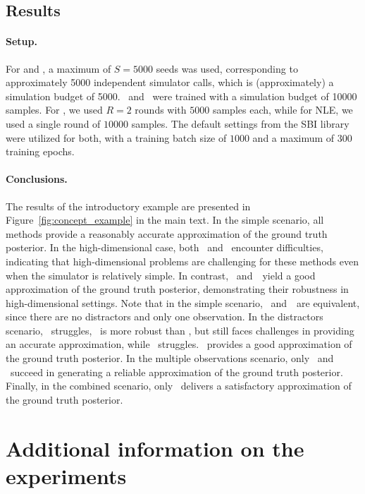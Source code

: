 \subsection{Results}

\paragraph{Setup.}
For \nromc and \rromc, a maximum of $S=5000$ seeds was used, corresponding to approximately 5000 independent simulator calls, which is (approximately) a simulation budget of 5000.
\NLE~and \NPE~were trained with a simulation budget of 10000 samples.
For \NPE, we used $R=2$ rounds with $5000$ samples each, while for NLE, we used a single round of $10000$ samples.
The default settings from the SBI library~\cite{lueckmann2021benchmarking} were utilized for both, with a training batch size of $1000$ and a maximum of $300$ training epochs.

\paragraph{Conclusions.}
The results of the introductory example are presented in Figure~\ref{fig:concept_example} in the main text.
In the simple scenario, all methods provide a reasonably accurate approximation of the ground truth posterior.
In the high-dimensional case, both \NPE~and \NLE~encounter difficulties, indicating that high-dimensional problems are challenging for these methods even when the simulator is relatively simple.
In contrast, \nromc~and~\rromc~yield a good approximation of the ground truth posterior, demonstrating their robustness in high-dimensional settings.
Note that in the simple scenario, \nromc~and~\rromc~are equivalent, since there are no distractors and only one observation.
In the distractors scenario, \NPE~struggles, \NLE~is more robust than \NPE, but still faces challenges in providing an accurate approximation, while \nromc~struggles.
\rromc~provides a good approximation of the ground truth posterior.
In the multiple observations scenario, only \NLE~and \rromc~succeed in generating a reliable approximation of the ground truth posterior.
Finally, in the combined scenario, only \rromc~delivers a satisfactory approximation of the ground truth posterior.


\clearpage
\section{Additional information on the experiments}
\label{app-sec:experiments}

